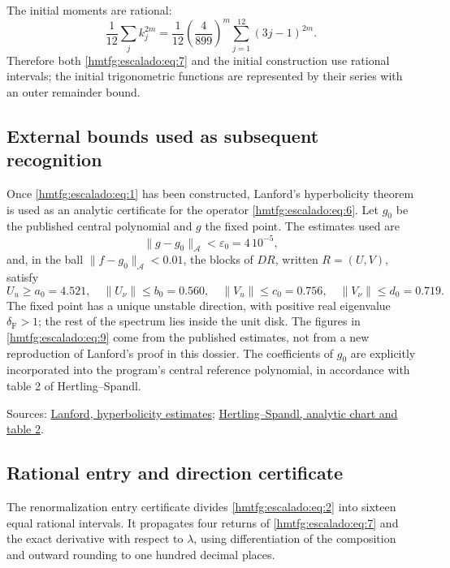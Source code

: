 The initial moments are rational:
\begin{equation}
\frac1{12}\sum_jk_j^{2m}
=\frac1{12}\left(\frac4{899}\right)^m
\sum_{j=1}^{12}(3j-1)^{2m}.
\label{hmtfg:escalado:eq:8}
\end{equation}
Therefore both \eqref{hmtfg:escalado:eq:7} and the initial construction use rational intervals; the initial trigonometric functions are represented by their series with an outer remainder bound.


\subsection{External bounds used as subsequent recognition}
\label{hmtfg:escalado:3}

Once \eqref{hmtfg:escalado:eq:1} has been constructed, Lanford’s hyperbolicity theorem is used as an analytic certificate for the operator \eqref{hmtfg:escalado:eq:6}. Let \(g_0\) be the published central polynomial and \(g\) the fixed point. The estimates used are
\[
\|g-g_0\|_{\mathcal A}<\varepsilon_0=4\,10^{-5},
\]
and, in the ball \(\|f-g_0\|_{\mathcal A}<0.01\), the blocks of \(DR\), written \(R=(U,V)\), satisfy
\begin{equation}
U_u\ge a_0=4.521,\quad
\|U_\nu\|\le b_0=0.560,\quad
\|V_u\|\le c_0=0.756,\quad
\|V_\nu\|\le d_0=0.719.
\label{hmtfg:escalado:eq:9}
\end{equation}
The fixed point has a unique unstable direction, with positive real eigenvalue \(\delta_{\mathrm F}>1\); the rest of the spectrum lies inside the unit disk. The figures in \eqref{hmtfg:escalado:eq:9} come from the published estimates, not from a new reproduction of Lanford’s proof in this dossier. The coefficients of \(g_0\) are explicitly incorporated into the program’s central reference polynomial, in accordance with table 2 of Hertling–Spandl.

Sources: \href{https://repo-archives.ihes.fr/A_GARDER/20180409/Test/I_Prepublications/LANFORD/1968-2013/P_81_17/P_81_17_web.pdf}{Lanford, hyperbolicity estimates}; \href{https://arxiv.org/pdf/1410.3277}{Hertling–Spandl, analytic chart and table 2}.


\subsection{Rational entry and direction certificate}
\label{hmtfg:escalado:4}

The renormalization entry certificate divides \eqref{hmtfg:escalado:eq:2} into sixteen equal rational intervals. It propagates four returns of \eqref{hmtfg:escalado:eq:7} and the exact derivative with respect to \(\lambda\), using differentiation of the composition and outward rounding to one hundred decimal places.

